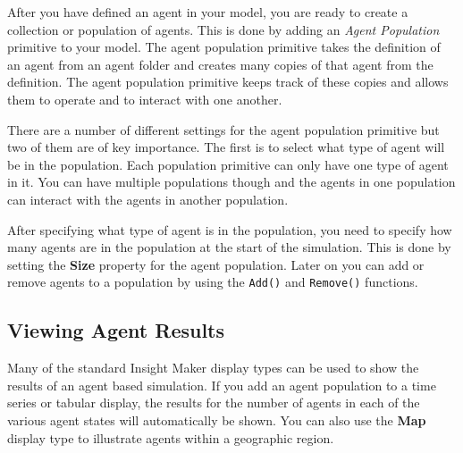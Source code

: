 \documentclass[]{memoir}
\renewcommand{\u}[1]{\textbf{#1}}
\renewcommand{\a}[1]{\textbf{#1}}
\begin{document}
After you have defined an agent in your model, you are ready to create a
collection or population of agents. This is done by adding an
\emph{Agent Population} primitive to your model. The agent population
primitive takes the definition of an agent from an agent folder and
creates many copies of that agent from the definition. The agent
population primitive keeps track of these copies and allows them to
operate and to interact with one another.

There are a number of different settings for the agent population
primitive but two of them are of key importance. The first is to select
what type of agent will be in the population. Each population primitive
can only have one type of agent in it. You can have multiple populations
though and the agents in one population can interact with the agents in
another population.

After specifying what type of agent is in the population, you need to
specify how many agents are in the population at the start of the
simulation. This is done by setting the \a{Size} property for the agent
population. Later on you can add or remove agents to a population by
using the \lstinline!Add()! and \lstinline!Remove()! functions.

\subsection{Viewing Agent Results}

Many of the standard Insight Maker display types can be used to show the
results of an agent based simulation. If you add an agent population to
a time series or tabular display, the results for the number of agents
in each of the various agent states will automatically be shown. You can
also use the \u{Map} display type to illustrate agents within a
geographic region.

\FloatBarrier 
\end{document}
